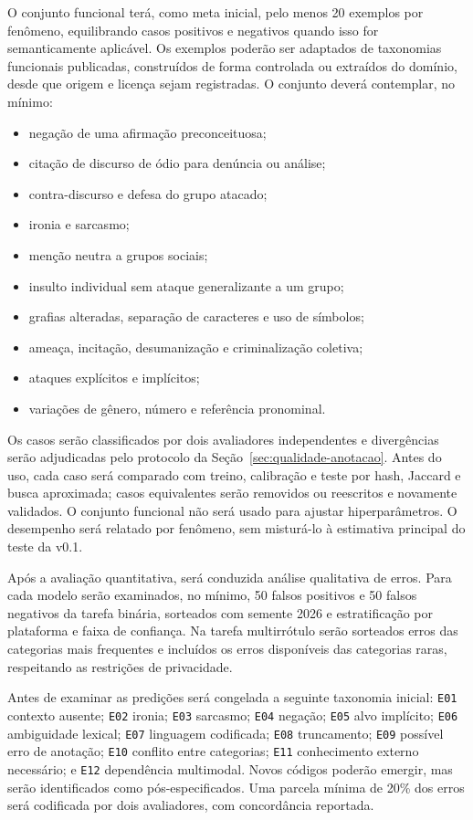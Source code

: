 O conjunto funcional terá, como meta inicial, pelo menos 20 exemplos por
fenômeno, equilibrando casos positivos e negativos quando isso for semanticamente
aplicável. Os exemplos poderão ser adaptados de taxonomias funcionais publicadas,
construídos de forma controlada ou extraídos do domínio, desde que origem e
licença sejam registradas. O conjunto deverá contemplar, no mínimo:

\begin{itemize}
    \item negação de uma afirmação preconceituosa;
    \item citação de discurso de ódio para denúncia ou análise;
    \item contra-discurso e defesa do grupo atacado;
    \item ironia e sarcasmo;
    \item menção neutra a grupos sociais;
    \item insulto individual sem ataque generalizante a um grupo;
    \item grafias alteradas, separação de caracteres e uso de símbolos;
    \item ameaça, incitação, desumanização e criminalização coletiva;
    \item ataques explícitos e implícitos;
    \item variações de gênero, número e referência pronominal.
\end{itemize}

Os casos serão classificados por dois avaliadores independentes e divergências
serão adjudicadas pelo protocolo da Seção~\ref{sec:qualidade-anotacao}. Antes do
uso, cada caso será comparado com treino, calibração e teste por hash, Jaccard e
busca aproximada; casos equivalentes serão removidos ou reescritos e novamente
validados. O conjunto funcional não será usado para ajustar hiperparâmetros. O
desempenho será relatado por fenômeno, sem misturá-lo à estimativa principal do
teste da v0.1.

Após a avaliação quantitativa, será conduzida análise qualitativa de erros. Para
cada modelo serão examinados, no mínimo, 50 falsos positivos e 50 falsos
negativos da tarefa binária, sorteados com semente 2026 e estratificação por
plataforma e faixa de confiança. Na tarefa multirrótulo serão sorteados erros das
categorias mais frequentes e incluídos os erros disponíveis das categorias raras,
respeitando as restrições de privacidade.

Antes de examinar as predições será congelada a seguinte taxonomia inicial:
\texttt{E01} contexto ausente; \texttt{E02} ironia; \texttt{E03} sarcasmo;
\texttt{E04} negação; \texttt{E05} alvo implícito; \texttt{E06} ambiguidade
lexical; \texttt{E07} linguagem codificada; \texttt{E08} truncamento;
\texttt{E09} possível erro de anotação; \texttt{E10} conflito entre categorias;
\texttt{E11} conhecimento externo necessário; e \texttt{E12} dependência
multimodal. Novos códigos poderão emergir, mas serão identificados como
pós-especificados. Uma parcela mínima de 20\% dos erros será codificada por dois
avaliadores, com concordância reportada.

